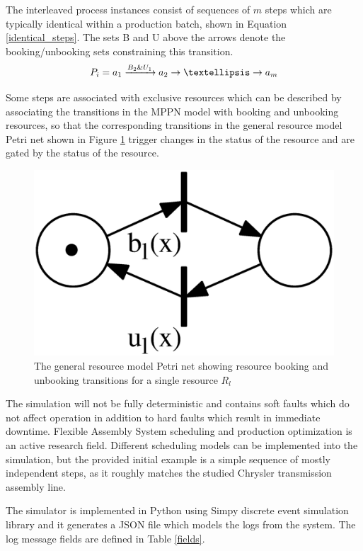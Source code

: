 \documentclass[journal]{IEEEtran}
\begin{document}
The interleaved process instances consist of sequences of $ m $ steps which are typically identical within a production batch, shown in Equation \ref{identical_steps}.
The sets B and U above the arrows denote the booking/unbooking sets constraining this transition.
\begin{equation}
 P_i = a_1 \xrightarrow{B_2 \& U_1} a_2 \rightarrow \textellipsis \rightarrow a_m
 \label{identical_steps}
\end{equation}

Some steps are associated with exclusive resources which can be described by associating the transitions in the MPPN model with booking and unbooking resources, so that
the corresponding transitions in the general resource model Petri net shown in Figure \ref{figure:resource_model} trigger changes in the status of the resource and
are gated by the status of the resource.

\begin{figure}[tb]
 \centering
 \includegraphics[width=8 cm,keepaspectratio=true]{./general_resource_model.eps}
 \caption{The general resource model Petri net showing resource booking and unbooking transitions for a single resource $ R_l $}
 \label{figure:resource_model}
\end{figure}

The simulation will not be fully deterministic and contains soft faults which do not affect operation in addition to hard faults which result in immediate downtime.
Flexible Assembly System scheduling and production optimization is an active research field. Different scheduling models can be implemented into the simulation,
but the provided initial example is a simple sequence of mostly independent steps, as it roughly matches the studied Chrysler transmission assembly line.

The simulator is implemented in Python using Simpy discrete event simulation library and it generates a JSON file which models the logs from the system.
The log message fields are defined in Table \ref{fields}.
\end{document}
